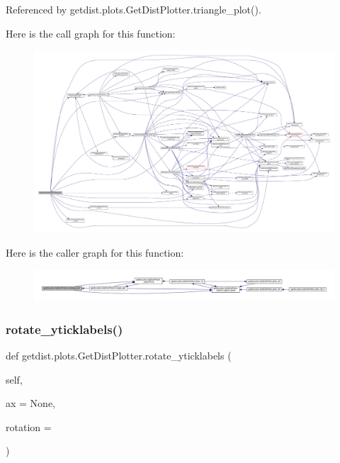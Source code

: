 Referenced by getdist.\+plots.\+Get\+Dist\+Plotter.\+triangle\+\_\+plot().

Here is the call graph for this function\+:
\nopagebreak
\begin{figure}[H]
\begin{center}
\leavevmode
\includegraphics[width=350pt]{classgetdist_1_1plots_1_1GetDistPlotter_a814e233ab36c48c3a3a34d4c837d4251_cgraph}
\end{center}
\end{figure}
Here is the caller graph for this function\+:
\nopagebreak
\begin{figure}[H]
\begin{center}
\leavevmode
\includegraphics[width=350pt]{classgetdist_1_1plots_1_1GetDistPlotter_a814e233ab36c48c3a3a34d4c837d4251_icgraph}
\end{center}
\end{figure}
\mbox{\label{classgetdist_1_1plots_1_1GetDistPlotter_a695a45a9dff3c9be3b44d4b652dfc2df}} 
\subsubsection{\texorpdfstring{rotate\+\_\+yticklabels()}{rotate\_yticklabels()}}
{\footnotesize\ttfamily def getdist.\+plots.\+Get\+Dist\+Plotter.\+rotate\+\_\+yticklabels (\begin{DoxyParamCaption}\item[{}]{self,  }\item[{}]{ax = {\ttfamily None},  }\item[{}]{rotation = {} }\end{DoxyParamCaption})}


